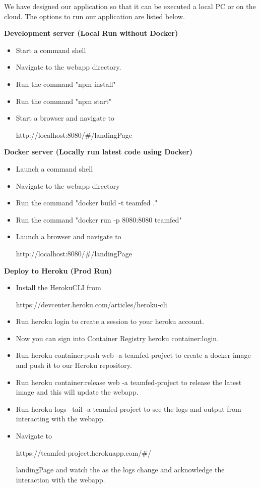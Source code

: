 \documentclass[sigconf,nonacm,11pt]{acmart}
\begin{document}
We have designed our application so that it can be executed a local PC or on the cloud.  The options to run our application are listed below.
\vspace{0.5em}

\textbf{Development server (Local Run without Docker)}
\begin{itemize}
\item Start a command shell
\item Navigate to the webapp directory.
\item Run the command "npm install" 
\item Run the command "npm start"
\item Start a browser and navigate to

http://localhost:8080/\#/landingPage
\end{itemize}


\textbf{Docker server (Locally run latest code using Docker)}
\begin{itemize}
\item Launch a command shell
\item Navigate to the webapp directory
\item Run the command "docker build -t teamfed ."
\item Run the command "docker run -p 8080:8080 teamfed" 
\item  Launch a browser and navigate to 

http://localhost:8080/#/landingPage
\end{itemize}

\vspace{0.5em}
\textbf{Deploy to Heroku (Prod Run)}
\begin{itemize}
\item Install the HerokuCLI from

https://devcenter.heroku.com/articles/heroku-cli
\item Run heroku login to create a session to your heroku account.
\item Now you can sign into Container Registry heroku container:login.
\item Run heroku container:push web -a teamfed-project to create a docker image and push it to our Heroku repository.
\item Run heroku container:release web -a teamfed-project to release the latest image and this will update the webapp.
\item Run heroku logs --tail -a teamfed-project to see the logs and output from interacting with the webapp.
\item Navigate to 

https://teamfed-project.herokuapp.com/#/

landingPage and watch the as the logs change and acknowledge the interaction with the webapp.
\end{itemize}
\end{document}

